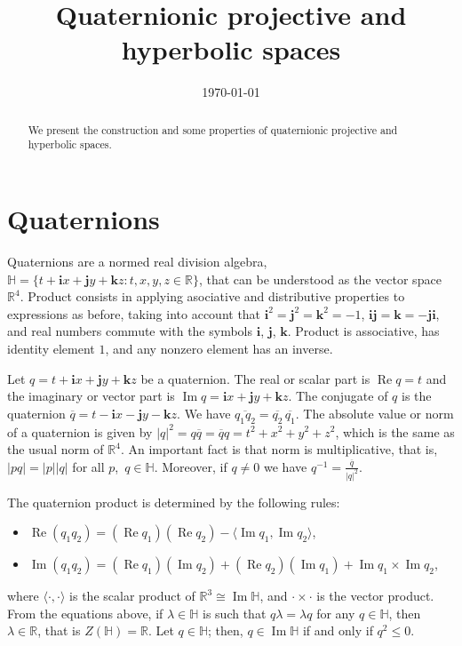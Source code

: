 \documentclass[12pt, a4paper]{amsart}
\newcommand{\R}{\mathbb{R}}
\renewcommand{\H}{\mathbb{H}}
\renewcommand{\Re}{\operatorname{Re}}
\renewcommand{\Im}{\operatorname{Im}}
\theoremstyle{remark}
\begin{document}
\title{Quaternionic projective and hyperbolic spaces}

\begin{abstract}
We present the construction and some properties of quaternionic projective and hyperbolic spaces.
\end{abstract}

\date{\today}
\maketitle

\section{Quaternions}

Quaternions are a normed real division algebra,  
{$\H=\{t+\mathbf{i}x+\mathbf{j}y+\mathbf{k}z:t,x,y,z\in\R\}$}, that can be understood as the vector space $\R^4$. 
Product consists in applying asociative and distributive properties to expressions as before, 
taking into account that $\mathbf{i}^2=\mathbf{j}^2=\mathbf{k}^2=-1$, $\mathbf{i}\mathbf{j}=\mathbf{k}=-\mathbf{j}\mathbf{i}$, and real numbers commute with the symbols 
$\mathbf{i}$, $\mathbf{j}$, $\mathbf{k}$. 
Product is associative, has identity element $1$, and any nonzero element has an inverse.

Let $q=t+\mathbf{i}x+\mathbf{j}y+\mathbf{k}z$ be a quaternion. 
The real or scalar part is $\Re{q}=t$ and the imaginary or vector part is 
$\Im{q}=\mathbf{i}x+\mathbf{j}y+\mathbf{k}z$. 
The {conjugate} of $q$ is the quaternion $\overline{q}=t-\mathbf{i}x-\mathbf{j}y-\mathbf{k}z$. 
We have $\overline{q_1 q_2}=\overline{q_2}\,\overline{q_1}$. 
The absolute value or norm of a quaternion is given by
$\lvert q\rvert^2=q\overline{q}=\overline{q}q=t^2+x^2+y^2+z^2$, 
which is the same as the usual norm of $\R^4$. 
An important fact is that norm is multiplicative, that is,
$\lvert pq\rvert=\lvert p\rvert\lvert q\rvert$ for all $p$,~$q\in\H$. 
Moreover, if $q\neq 0$ we have $q^{-1}=\frac{\overline{q}}{\lvert q\rvert^2}$.

The quaternion product is determined by the following rules:
\begin{itemize}
\item $\Re{(q_1 q_2)}=(\Re{q_1})(\Re{q_2})-\langle \Im{q_1},\Im{q_2}\rangle$,
\item $\Im{(q_1 q_2)}=(\Re{q_1})(\Im{q_2})+(\Re{q_2})(\Im{q_1})+\Im{q_1}\times\Im{q_2}$,
\end{itemize}
where $\langle\cdot,\cdot\rangle$ is the scalar product of $\R^3\cong\Im\H$, 
and $\cdot\times\cdot$ is the vector product. 
From the equations above, if $\lambda\in\H$ is such that $q\lambda=\lambda q$ for any $q\in\H$, then $\lambda\in\R$, that is $Z(\H)=\R$.
Let $q\in\H$; then, $q\in\Im\H$ if and only if $q^2\leq 0$.
\end{document}
